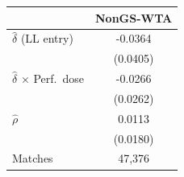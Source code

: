 \begin{tabular}{lc}
\toprule
 & NonGS-WTA \\
\midrule
$\hat{\delta}$ (LL entry) & -0.0364 \\
 & (0.0405) \\
$\hat{\delta}$ $\times$ Perf.\ dose & -0.0266 \\
 & (0.0262) \\
$\hat{\rho}$ & 0.0113 \\
 & (0.0180) \\
\midrule
Matches & 47,376 \\
\bottomrule
\end{tabular}
